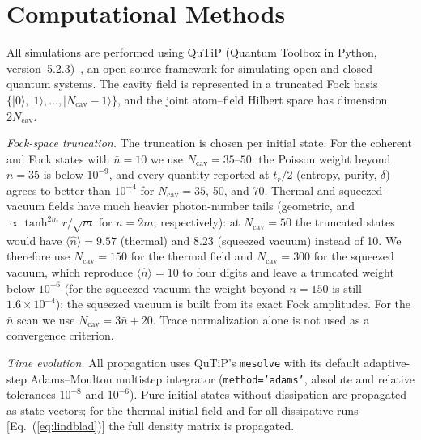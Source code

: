 \documentclass[%
 reprint,
 amsmath,amssymb,
 aps,
 floatfix,
]{revtex4-2}
\begin{document}
\section{Computational Methods}
\label{sec:methods}

All simulations are performed using QuTiP (Quantum Toolbox in Python, version~5.2.3)~\cite{johansson2012, johansson2013}, an open-source framework for simulating open and closed quantum systems. The cavity field is represented in a truncated Fock basis $\{|0\rangle, |1\rangle, \ldots, |N_{\text{cav}}-1\rangle\}$, and the joint atom--field Hilbert space has dimension $2N_{\text{cav}}$.

\textit{Fock-space truncation.} The truncation is chosen per initial state. For the coherent and Fock states with $\bar{n} = 10$ we use $N_{\text{cav}} = 35$--$50$: the Poisson weight beyond $n = 35$ is below $10^{-9}$, and every quantity reported at $t_r/2$ (entropy, purity, $\delta$) agrees to better than $10^{-4}$ for $N_{\text{cav}} = 35$, 50, and 70. Thermal and squeezed-vacuum fields have much heavier photon-number tails (geometric, and $\propto \tanh^{2m}r/\sqrt{m}$ for $n = 2m$, respectively): at $N_{\text{cav}} = 50$ the truncated states would have $\langle\hat{n}\rangle = 9.57$ (thermal) and $8.23$ (squeezed vacuum) instead of 10. We therefore use $N_{\text{cav}} = 150$ for the thermal field and $N_{\text{cav}} = 300$ for the squeezed vacuum, which reproduce $\langle\hat{n}\rangle = 10$ to four digits and leave a truncated weight below $10^{-6}$ (for the squeezed vacuum the weight beyond $n = 150$ is still $1.6\times10^{-4}$); the squeezed vacuum is built from its exact Fock amplitudes. For the $\bar{n}$ scan we use $N_{\text{cav}} = 3\bar{n} + 20$. Trace normalization alone is not used as a convergence criterion.

\textit{Time evolution.} All propagation uses QuTiP's \texttt{mesolve} with its default adaptive-step Adams--Moulton multistep integrator (\texttt{method='adams'}, absolute and relative tolerances $10^{-8}$ and $10^{-6}$). Pure initial states without dissipation are propagated as state vectors; for the thermal initial field and for all dissipative runs [Eq.~(\ref{eq:lindblad})] the full density matrix is propagated.
\end{document}
